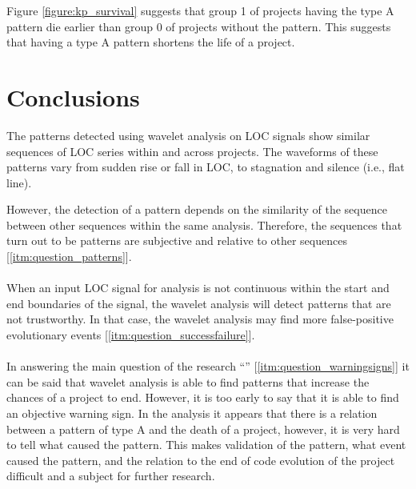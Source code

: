 

\noindent
Figure \ref{figure:kp_survival} suggests that group 1 of projects having the
type A pattern die earlier than group 0 of projects without the pattern. This
suggests that having a type A pattern shortens the life of a project.

\section{Conclusions}

The patterns detected using wavelet analysis on LOC signals show similar
sequences of LOC series within and across projects. The waveforms of these
patterns vary from sudden rise or fall in LOC, to stagnation and silence (i.e.,
flat line).

However, the detection of a pattern depends on the similarity of the sequence
between other sequences within the same analysis. Therefore, the sequences that
turn out to be patterns are subjective and relative to other sequences
[\ref{itm:question_patterns}].

\paragraph{}
When an input LOC signal for analysis is not continuous within the start
and end boundaries of the signal, the wavelet analysis will detect patterns
that are not trustworthy. In that case, the wavelet analysis may find
more false-positive evolutionary events [\ref{itm:question_successfailure}].

\paragraph{}
In answering the main question of the research
``\emph{\researchQuestion}\rm'' [\ref{itm:question_warningsigns}]
it can be said that wavelet analysis is able to find patterns that increase the
chances of a project to end. However, it is too early to say that it is able to
find an objective warning sign. In the analysis it appears that there is a
relation between a pattern of type A and the death of a project, however, it is
very hard to tell what caused the pattern.
This makes validation of the pattern, what event caused the pattern, and the
relation to the end of code evolution of the project difficult and a subject
for further research.


